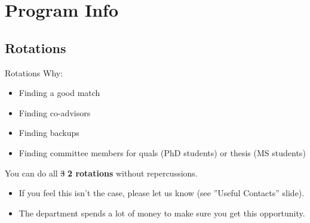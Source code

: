 \documentclass[aspectratio=169]{beamer}
\begin{document}
\section{Program Info}

\subsection{Rotations}

\begin{frame}{Rotations}
Why:
\begin{itemize}
    \item Finding a good match
    \item Finding co-advisors
    \item Finding backups
    \item Finding committee members for quals (PhD students) or thesis (MS students)
\end{itemize}
You can do all \st{3} \textbf{2 rotations} without repercussions. 
\begin{itemize}
    \item If you feel this isn't the case, please let us know (see ''Useful Contacts'' slide).
    \item The department spends a lot of money to make sure you get this opportunity.
\end{itemize}
\end{frame}
\end{document}

